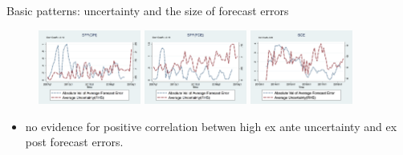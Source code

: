 \documentclass{beamer}
\begin{document}
\begin{frame}{Basic patterns: uncertainty and the size of forecast errors}
	\begin{figure}
		\centering
		\label{FEVar}
		\includegraphics[width=0.3\textwidth]{figuresDraft/SPFCPI_abFE_varSPFCPIQ.png}
		\includegraphics[width=0.3\textwidth]{figuresDraft/SPFPCE_abFE_varSPFPCEQ.png}
		\includegraphics[width=0.3\textwidth]{figuresDraft/SCE_abFE_varSCEM.png}
	\end{figure}
\begin{itemize}
\item no evidence for positive correlation betwen high ex ante uncertainty and ex post forecast errors.
\end{itemize}
\end{frame}
\end{document}
